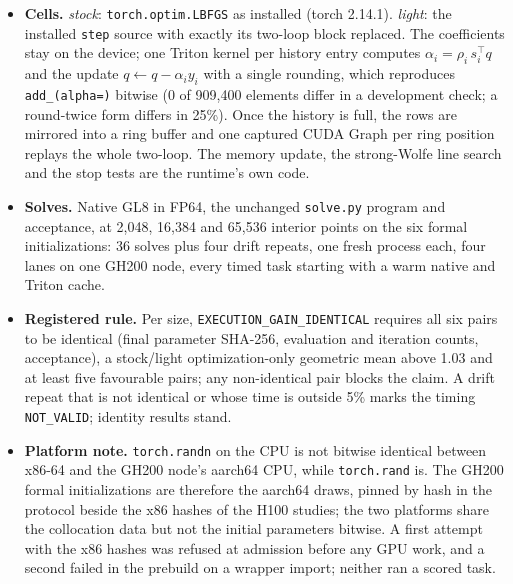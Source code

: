 \documentclass[11pt]{article}
\begin{document}
\begin{itemize}
\item \textbf{Cells.} \emph{stock}: \texttt{torch.optim.LBFGS} as
  installed (torch 2.14.1). \emph{light}: the installed \texttt{step}
  source with exactly its two-loop block replaced. The coefficients stay on
  the device; one Triton kernel per history entry computes
  $\alpha_i = \rho_i\, s_i^\top q$ and the update $q \leftarrow q - \alpha_i
  y_i$ with a single rounding, which reproduces \texttt{add\_(alpha=)}
  bitwise (0 of 909,400 elements differ in a development check; a
  round-twice form differs in 25\%). Once the history is full, the rows
  are mirrored into a ring buffer and one captured CUDA Graph per ring
  position replays the whole two-loop. The memory update, the strong-Wolfe
  line search and the stop tests are the runtime's own code.
\item \textbf{Solves.} Native GL8 in FP64, the unchanged \texttt{solve.py}
  program and acceptance, at 2,048, 16,384 and 65,536 interior points on
  the six formal initializations: 36 solves plus four drift repeats, one
  fresh process each, four lanes on one GH200 node, every timed task
  starting with a warm native and Triton cache.
\item \textbf{Registered rule.} Per size, \texttt{EXECUTION\_GAIN\_IDENTICAL}
  requires all six pairs to be identical (final parameter SHA-256,
  evaluation and iteration counts, acceptance), a stock/light
  optimization-only geometric mean above 1.03 and at least five favourable
  pairs; any non-identical pair blocks the claim. A drift repeat that is
  not identical or whose time is outside 5\% marks the timing
  \texttt{NOT\_VALID}; identity results stand.
\item \textbf{Platform note.} \texttt{torch.randn} on the CPU is not
  bitwise identical between x86-64 and the GH200 node's aarch64 CPU, while
  \texttt{torch.rand} is. The GH200 formal initializations are therefore
  the aarch64 draws, pinned by hash in the protocol beside the x86 hashes of
  the H100 studies; the two platforms share the collocation data but not
  the initial parameters bitwise. A first attempt with the x86 hashes was
  refused at admission before any GPU work, and a second failed in the
  prebuild on a wrapper import; neither ran a scored task.
\end{itemize}
\end{document}
